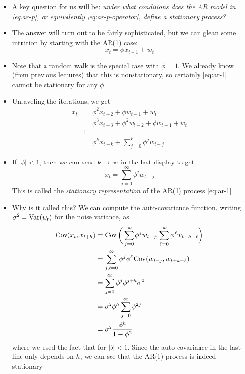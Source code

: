 \documentclass{article}
\begin{document}
\begin{itemize}
\item A key question for us will be: \emph{under what conditions does the AR
    model  in \eqref{eq:ar-p}, or equivalently \eqref{eq:ar-p-operator}, define
    a stationary process?} 

\item The answer will turn out to be fairly sophisticated, but we can glean some
  intuition by starting with the AR(1) case: 
  \begin{equation}
  \label{eq:ar-1}
  x_t = \phi x_{t-1} + w_t 
  \end{equation}

\item Note that a random walk is the special case with $\phi = 1$. We already
  know (from previous lectures) that this is nonstationary, so certainly
  \eqref{eq:ar-1} cannot be stationary for any $\phi$

\item Unraveling the iterations, we get
  \begin{align*}
  x_t &= \phi^2 x_{t-2} + \phi w_{t-1} + w_t \\
  &= \phi^3 x_{t-3} + \phi^2 w_{t-2} + \phi w_{t-1} + w_t \\  
  &\vdots \\ 
  &= \phi^k x_{t-k} + \sum_{j=0}^k \phi^j w_{t-j} 
  \end{align*}

\item If $|\phi| < 1$, then we can send $k \to \infty$ in the last display to 
  get 
  \begin{equation}
  \label{eq:ar-1-stationary}
  x_t = \sum_{j=0}^\infty \phi^j w_{t-j} 
  \end{equation}
  This is called the \emph{stationary representation} of the AR(1) process
  \eqref{eq:ar-1} 

\item Why is it called this? We can compute the auto-covariance function,
  writing $\sigma^2 = \operatorname{Var}(w_t)$ for the noise variance, as
  \begin{align}
  \nonumber
  \operatorname{Cov}(x_t, x_{t+h}) &= \operatorname{Cov}\bigg( \sum_{j=0}^\infty \phi^j w_{t-j}, 
  \sum_{\ell=0}^\infty \phi^\ell w_{t+h-\ell} \bigg) \\
  \nonumber
  &= \sum_{j,\ell=0}^\infty \phi^j \phi^\ell \operatorname{Cov}( w_{t-j}, w_{t+h-\ell} ) \\ 
  \nonumber
  &= \sum_{j=0}^\infty \phi^j \phi^{j+h} \sigma^2 \\
  \nonumber
  &= \sigma^2 \phi^h \sum_{j=0}^\infty \phi^{2j} \\
  \label{eq:ar-1-auto-cov}
  &= \sigma^2 \frac{\phi^h}{1 - \phi^2}    
  \end{align}
  where we used the fact that  for $|b|
  < 1$. Since the auto-covariance in the last line only depends on $h$, we can
  see that the AR(1) process is indeed stationary


\end{itemize}
\end{document}
